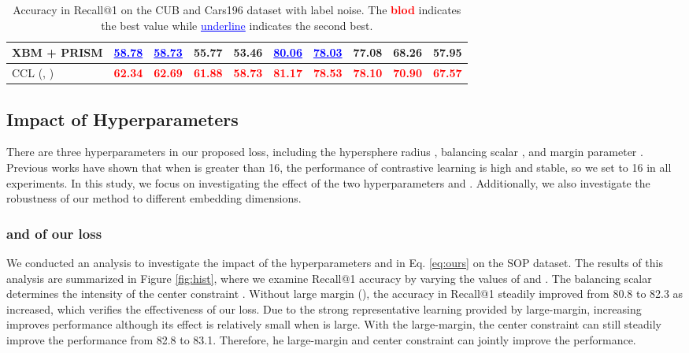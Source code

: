 \documentclass[10pt,twocolumn,letterpaper]{article}
\begin{document}
\begin{table*}[ht]
\begin{tabular}{l|cccc|ccccc}
    XBM + PRISM \cite{prism} &\textcolor{blue}{\underline{58.78}}&\textcolor{blue}{\underline{58.73}}&55.77&53.46&\textcolor{blue}{\underline{80.06}}&\textcolor{blue}{\underline{78.03}}&77.08&68.26&57.95\\
\hline
CCL (, ) &\textcolor{red}{\textbf{62.34}}&\textcolor{red}{\textbf{62.69}}&\textcolor{red}{\textbf{61.88}}&\textcolor{red}{\textbf{58.73}}&\textcolor{red}{\textbf{81.17}}&\textcolor{red}{\textbf{78.53}}&\textcolor{red}{\textbf{78.10}}&\textcolor{red}{\textbf{70.90}}&\textcolor{red}{\textbf{67.57}}\\
\hline
\end{tabular}
\caption{Accuracy in Recall@1 on the CUB and Cars196 dataset with label noise. The \textcolor{red}{\textbf{blod}} indicates the best value while \textcolor{blue}{\underline{underline}} indicates the second best.}
\label{tab:noise}
\end{table*}


\subsection{Impact of Hyperparameters}
There are three hyperparameters in our proposed loss, including the hypersphere radius , balancing scalar , and margin parameter . Previous works \cite{proxyanchor,cosface,circleloss,mocov3} have shown that when  is greater than 16, the performance of contrastive learning is high and stable, so we set  to 16 in all experiments. In this study, we focus on investigating the effect of the two hyperparameters  and . Additionally, we also investigate the robustness of our method to different embedding dimensions.

\subsubsection{ and  of our loss}
\label{sec:parameter}

We conducted an analysis to investigate the impact of the hyperparameters  and  in Eq. \eqref{eq:ours} on the SOP \cite{liftstruct} dataset. The results of this analysis are summarized in Figure \ref{fig:hist}, where we examine Recall@1 accuracy by varying the values of  and . The balancing scalar  determines the intensity of the center constraint . Without large margin (), the accuracy in Recall@1 steadily improved from 80.8 to 82.3 as  increased, which verifies the effectiveness of our loss. Due to the strong representative learning provided by large-margin, increasing  improves performance although its effect is relatively small when  is large. With the large-margin, the center constraint can still steadily improve the performance from 82.8 to 83.1. Therefore, he large-margin and center constraint can jointly improve the performance.
\end{document}
